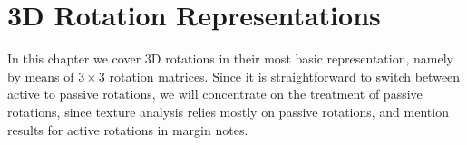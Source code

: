 %




\renewcommand{\chaptergraphicspath}{src/3Drotations/eps/}

\chapterimage{\noheaderimage}

\chapter{3D Rotation Representations\label{chap:3Drotations}}
In this chapter we cover 3D rotations in their most basic representation, namely by means of $3\times 3$ rotation matrices. Since it is straightforward to switch between active to passive rotations, we will concentrate on the treatment of passive rotations, since texture analysis relies mostly on passive rotations, and mention results for active rotations in margin notes.

